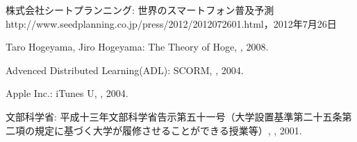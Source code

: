 \begin{bib}[100]


  株式会社シートプランニング:
  \newblock 世界のスマートフォン普及予測
  \newblock http://www.seedplanning.co.jp/press/2012/2012072601.html，2012年7月26日

  Taro Hogeyama, Jiro Hogeyama:
  \newblock The Theory of Hoge,
  , 2008.

  Advenced Distributed Learning(ADL):
  \newblock SCORM,
  , 2004.
  
  Apple Inc.:
  \newblock iTunes U,
  , 2004. 
 
  文部科学省:
  \newblock 平成十三年文部科学省告示第五十一号（大学設置基準第二十五条第二項の規定に基づく大学が履修させることができる授業等）,
  , 2001.

\end{bib}